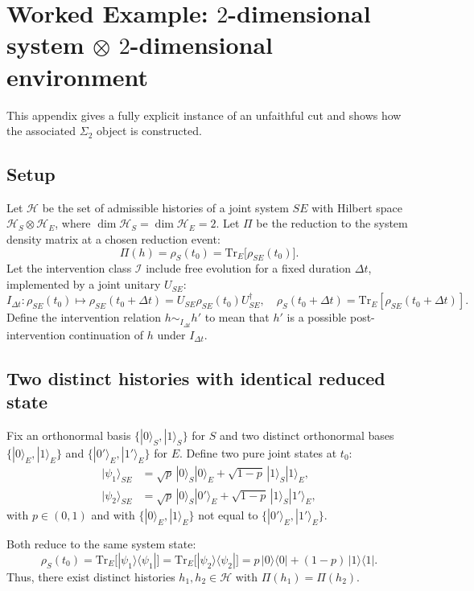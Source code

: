 \appendix
\section{\texorpdfstring{Worked Example: $2$-dimensional system $\otimes$ $2$-dimensional environment}{Worked Example: 2D system x 2D environment}}
\label{app:worked-example}

This appendix gives a fully explicit instance of an unfaithful cut and shows how the associated
$\Sigma_2$ object is constructed.

\subsection{Setup}

Let $\mathcal{H}$ be the set of admissible histories of a joint system $SE$ with Hilbert space
$\mathcal{H}_S \otimes \mathcal{H}_E$, where $\dim \mathcal{H}_S=\dim \mathcal{H}_E=2$.
Let $\Pi$ be the reduction to the system density matrix at a chosen reduction event:
\[
  \Pi(h) = \rho_S(t_0) = \mathrm{Tr}_E\big[\rho_{SE}(t_0)\big].
\]
Let the intervention class $\mathcal{I}$ include free evolution for a fixed duration $\Delta t$,
implemented by a joint unitary $U_{SE}$:
\[
  I_{\Delta t}: \rho_{SE}(t_0) \mapsto \rho_{SE}(t_0+\Delta t) = U_{SE}\rho_{SE}(t_0)U_{SE}^\dagger,
\quad
  \rho_S(t_0+\Delta t)=\mathrm{Tr}_E[\rho_{SE}(t_0+\Delta t)].
\]
Define the intervention relation $h \sim_{I_{\Delta t}} h'$ to mean that $h'$ is a possible
post-intervention continuation of $h$ under $I_{\Delta t}$.

\subsection{Two distinct histories with identical reduced state}

Fix an orthonormal basis $\{|0\rangle_S,|1\rangle_S\}$ for $S$ and two distinct orthonormal
bases $\{|0\rangle_E,|1\rangle_E\}$ and $\{|0'\rangle_E,|1'\rangle_E\}$ for $E$.
Define two pure joint states at $t_0$:
\begin{align}
  |\psi_1\rangle_{SE} &= \sqrt{p}\,|0\rangle_S|0\rangle_E + \sqrt{1-p}\,|1\rangle_S|1\rangle_E,\\
  |\psi_2\rangle_{SE} &= \sqrt{p}\,|0\rangle_S|0'\rangle_E + \sqrt{1-p}\,|1\rangle_S|1'\rangle_E,
\end{align}
with $p\in(0,1)$ and with $\{|0\rangle_E,|1\rangle_E\}$ not equal to $\{|0'\rangle_E,|1'\rangle_E\}$.

Both reduce to the same system state:
\[
  \rho_S(t_0)
  = \mathrm{Tr}_E\big[|\psi_1\rangle\langle\psi_1|\big]
  = \mathrm{Tr}_E\big[|\psi_2\rangle\langle\psi_2|\big]
  = p\,|0\rangle\langle 0| + (1-p)\,|1\rangle\langle 1|.
\]
Thus, there exist distinct histories $h_1,h_2 \in \mathcal{H}$ with $\Pi(h_1)=\Pi(h_2)$.

